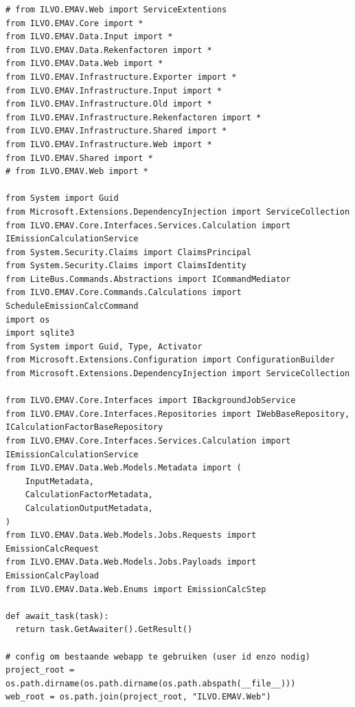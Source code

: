 \begin{verbatim}
# from ILVO.EMAV.Web import ServiceExtentions
from ILVO.EMAV.Core import *
from ILVO.EMAV.Data.Input import *
from ILVO.EMAV.Data.Rekenfactoren import *
from ILVO.EMAV.Data.Web import *
from ILVO.EMAV.Infrastructure.Exporter import *
from ILVO.EMAV.Infrastructure.Input import *
from ILVO.EMAV.Infrastructure.Old import *
from ILVO.EMAV.Infrastructure.Rekenfactoren import *
from ILVO.EMAV.Infrastructure.Shared import *
from ILVO.EMAV.Infrastructure.Web import *
from ILVO.EMAV.Shared import *
# from ILVO.EMAV.Web import *

from System import Guid
from Microsoft.Extensions.DependencyInjection import ServiceCollection
from ILVO.EMAV.Core.Interfaces.Services.Calculation import IEmissionCalculationService
from System.Security.Claims import ClaimsPrincipal
from System.Security.Claims import ClaimsIdentity
from LiteBus.Commands.Abstractions import ICommandMediator
from ILVO.EMAV.Core.Commands.Calculations import ScheduleEmissionCalcCommand
import os
import sqlite3
from System import Guid, Type, Activator
from Microsoft.Extensions.Configuration import ConfigurationBuilder
from Microsoft.Extensions.DependencyInjection import ServiceCollection

from ILVO.EMAV.Core.Interfaces import IBackgroundJobService
from ILVO.EMAV.Core.Interfaces.Repositories import IWebBaseRepository, ICalculationFactorBaseRepository
from ILVO.EMAV.Core.Interfaces.Services.Calculation import IEmissionCalculationService
from ILVO.EMAV.Data.Web.Models.Metadata import (
    InputMetadata,
    CalculationFactorMetadata,
    CalculationOutputMetadata,
)
from ILVO.EMAV.Data.Web.Models.Jobs.Requests import EmissionCalcRequest
from ILVO.EMAV.Data.Web.Models.Jobs.Payloads import EmissionCalcPayload
from ILVO.EMAV.Data.Web.Enums import EmissionCalcStep

def await_task(task):
  return task.GetAwaiter().GetResult()

# config om bestaande webapp te gebruiken (user id enzo nodig)
project_root = os.path.dirname(os.path.dirname(os.path.abspath(__file__)))
web_root = os.path.join(project_root, "ILVO.EMAV.Web")


\end{verbatim}
